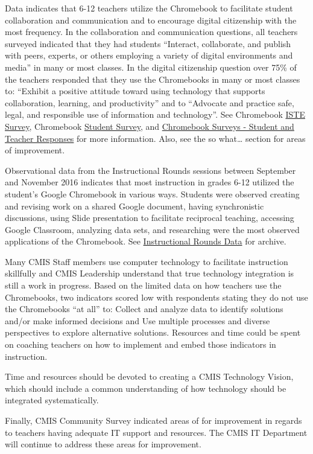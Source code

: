 \documentclass{report}
\begin{document}
\begin{findings}
Data indicates that 6-12 teachers utilize the Chromebook to facilitate student collaboration and communication and to encourage digital citizenship with the most frequency. In the collaboration and communication questions, all teachers surveyed  indicated that they had students “Interact, collaborate, and publish with peers, experts, or others employing a variety of digital environments and media” in many or most classes. In the digital citizenship question over 75\% of the teachers responded that they use the Chromebooks in many or most classes to: “Exhibit a positive attitude toward using technology that supports collaboration, learning, and productivity” and to “Advocate and practice safe, legal, and responsible use of information and technology”. See Chromebook \href{https://goo.gl/forms/QsbCBzfO0psqcbXQ2}{ISTE Survey}, Chromebook \href{https://goo.gl/forms/1mda4plq0tzQiTed2}{Student Survey}, and \href{https://docs.google.com/a/cmis.ac.th/presentation/d/1xmLAJD96klLrjiBPwCoOMoKmbclYqpIMWaifytzFMgk/edit?usp=sharing}{Chromebook Surveys - Student and Teacher Responses} for more information. Also, see the so what… section for areas of improvement.


Observational data from the Instructional Rounds sessions between September and November 2016 indicates that most instruction in grades 6-12 utilized the student’s Google Chromebook in various ways. Students were observed creating and revising work on a shared Google document, having synchronistic discussions,  using Slide presentation to facilitate reciprocal teaching, accessing Google Classroom, analyzing data sets, and researching were the most observed applications of the Chromebook. See \href{https://drive.google.com/drive/folders/0ByVFfrm0zfolUkxUSmg2VGJCTGc?usp=sharing}{Instructional Rounds Data} for archive.


Many CMIS Staff members use computer technology to facilitate instruction skillfully and CMIS Leadership understand that true technology integration is still a work in progress. Based on the limited data on how teachers use the Chromebooks, two indicators scored low with respondents stating they do not use the Chromebooks “at all”  to: Collect and analyze data to identify solutions and/or make informed decisions and Use multiple processes and diverse perspectives to explore alternative solutions. Resources and time could be spent on coaching teachers on how to implement and embed those indicators in instruction.

Time and resources should be devoted to creating a CMIS Technology Vision, which should include a common understanding of how technology should be integrated systematically. 

Finally, CMIS Community Survey indicated areas of for improvement in regards to teachers having adequate IT support and resources. The CMIS IT Department will continue to address these areas for improvement. 
\end{findings}
\end{document}
